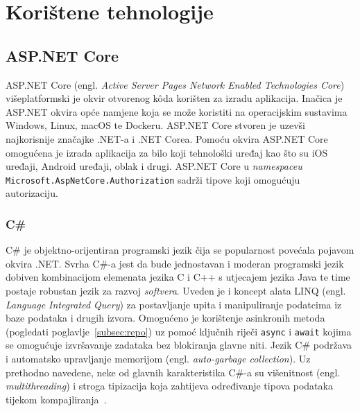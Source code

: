 \section{Korištene tehnologije}

\subsection{ASP.NET Core}

ASP.NET Core (engl. \textit{Active Server Pages Network Enabled Technologies Core}) višeplatformski je okvir otvorenog k\^oda korišten za izradu aplikacija. Inačica je ASP.NET okvira opće namjene koja se može koristiti na operacijskim sustavima Windows, Linux, macOS te Dockeru. ASP.NET Core stvoren je uzevši najkorisnije značajke .NET-a i .NET Corea. Pomoću okvira ASP.NET Core omogućena je izrada aplikacija za bilo koji tehnološki uređaj kao što su iOS uređaji, Android uređaji, oblak i drugi. ASP.NET Core u \textit{namespaceu} \texttt{Microsoft.AspNetCore.Authorization} sadrži tipove koji omogućuju autorizaciju\cite{aspNetCore}.


\subsubsection{C\#}
C\# je objektno-orijentiran programski jezik čija se popularnost povećala pojavom okvira .NET. Svrha C\#-a jest da bude jednostavan i moderan programski jezik dobiven kombinacijom elemenata jezika C i C++  s utjecajem jezika Java te time postaje robustan jezik za razvoj \textit{softvera}. Uveden je i koncept alata LINQ (engl. \textit{Language Integrated Query}) za postavljanje upita i manipuliranje podatcima iz baze podataka i drugih izvora. Omogućeno je korištenje asinkronih metoda (pogledati poglavlje~\ref{subsec:repo}) uz pomoć ključnih riječi \texttt{async} i \texttt{await} kojima se omogućuje izvršavanje zadataka bez blokiranja glavne niti. Jezik C\# podržava i automatsko upravljanje memorijom (engl. \textit{auto-garbage collection}). Uz prethodno navedene, neke od glavnih karakteristika C\#-a su višenitnost (engl. \textit{multithreading}) i stroga tipizacija koja zahtijeva određivanje tipova podataka tijekom kompajliranja~\cite{cSharp}.

